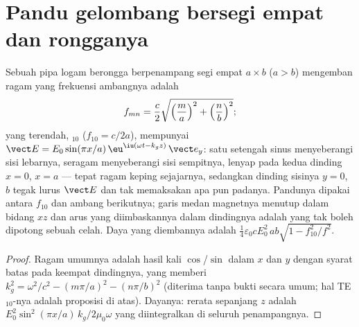 \section{Pandu gelombang bersegi empat dan rongganya}

\begin{proposition}\label{prop:b2:guided-waves:rectangular}
Sebuah pipa logam berongga berpenampang segi empat $a \times b$ ($a > b$) mengemban
ragam yang frekuensi ambangnya adalah
\[
f_{mn} = \frac c2\sqrt{\Bigl(\frac ma\Bigr)^2 + \Bigl(\frac nb\Bigr)^2} ;
\]
yang terendah, \emph{$_{10}$} ($f_{10} = c/2a$), mempunyai $\vect E = E_0\sin
(\pi x/a)\,\eu^{\iu(\omega t - k_gz)}\,\vect e_y$: satu setengah sinus menyeberangi sisi
lebarnya, seragam menyeberangi sisi sempitnya, lenyap pada kedua dinding $x = 0$,
$x = a$ --- tepat ragam keping sejajarnya, sedangkan dinding sisinya $y = 0$, $b$
tegak lurus $\vect E$ dan tak memaksakan apa pun padanya. Pandunya
dipakai antara $f_{10}$ dan ambang berikutnya; garis medan magnetnya
menutup dalam bidang $xz$ dan arus yang diimbaskannya dalam dindingnya adalah
yang tak boleh dipotong sebuah celah. Daya yang diembannya adalah $\tfrac14\varepsilon_0cE_0^2\,ab
\sqrt{1 - f_{10}^2/f^2}$.
\end{proposition}

\begin{proof}
Ragam umumnya adalah hasil kali $\cos$/$\sin$ dalam $x$ dan $y$ dengan
syarat batas pada keempat dindingnya, yang memberi $k_g^2 = \omega^2/c^2 - (m\pi/a)^2
- (n\pi/b)^2$ (diterima tanpa bukti secara umum; hal TE$_{10}$-nya adalah proposisi
di atas). Dayanya:  rerata sepanjang $z$ adalah $E_0^2\sin^2(\pi x/a)
\,k_g/2\mu_0\omega$ yang diintegralkan di seluruh penampangnya.
\end{proof}

